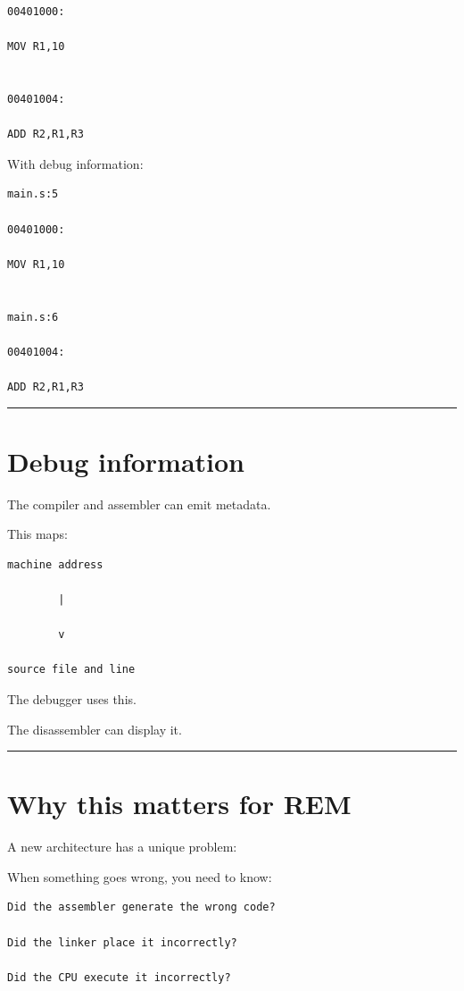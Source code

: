 \documentclass[
  oneside,
  openany]{book}
\begin{document}
\begin{verbatim}
00401000:

MOV R1,10


00401004:

ADD R2,R1,R3
\end{verbatim}

With debug information:

\begin{verbatim}
main.s:5

00401000:

MOV R1,10


main.s:6

00401004:

ADD R2,R1,R3
\end{verbatim}

\begin{center}\rule{0.5\linewidth}{0.5pt}\end{center}

\hypertarget{debug-information-1}{%
\section{Debug information}\label{debug-information-1}}

The compiler and assembler can emit metadata.

This maps:

\begin{verbatim}
machine address

        |

        v

source file and line
\end{verbatim}

The debugger uses this.

The disassembler can display it.

\begin{center}\rule{0.5\linewidth}{0.5pt}\end{center}

\hypertarget{why-this-matters-for-rem}{%
\section{Why this matters for REM}\label{why-this-matters-for-rem}}

A new architecture has a unique problem:

When something goes wrong, you need to know:

\begin{verbatim}
Did the assembler generate the wrong code?

Did the linker place it incorrectly?

Did the CPU execute it incorrectly?
\end{verbatim}
\end{document}
